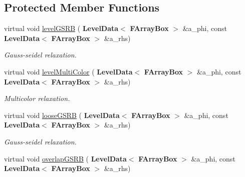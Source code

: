 \subsection*{Protected Member Functions}
\begin{DoxyCompactItemize}
\item 
\mbox{\label{class_a_m_r_non_linear_multi_comp_op_a8ec4d6960ca7282d700aa370b3ce875e}} 
virtual void \hyperlink{class_a_m_r_non_linear_multi_comp_op_a8ec4d6960ca7282d700aa370b3ce875e}{level\+G\+S\+RB} (\textbf{ Level\+Data}$<$ \textbf{ F\+Array\+Box} $>$ \&a\+\_\+phi, const \textbf{ Level\+Data}$<$ \textbf{ F\+Array\+Box} $>$ \&a\+\_\+rhs)
\begin{DoxyCompactList}\small\item\em Gauss-\/seidel relaxation. \end{DoxyCompactList}\item 
\mbox{\label{class_a_m_r_non_linear_multi_comp_op_a68cf60aeb967af9a3c7e1c628d7969f2}} 
virtual void \hyperlink{class_a_m_r_non_linear_multi_comp_op_a68cf60aeb967af9a3c7e1c628d7969f2}{level\+Multi\+Color} (\textbf{ Level\+Data}$<$ \textbf{ F\+Array\+Box} $>$ \&a\+\_\+phi, const \textbf{ Level\+Data}$<$ \textbf{ F\+Array\+Box} $>$ \&a\+\_\+rhs)
\begin{DoxyCompactList}\small\item\em Multicolor relaxation. \end{DoxyCompactList}\item 
\mbox{\label{class_a_m_r_non_linear_multi_comp_op_a2bb1423e981bdf7357bc3faab3385908}} 
virtual void \hyperlink{class_a_m_r_non_linear_multi_comp_op_a2bb1423e981bdf7357bc3faab3385908}{loose\+G\+S\+RB} (\textbf{ Level\+Data}$<$ \textbf{ F\+Array\+Box} $>$ \&a\+\_\+phi, const \textbf{ Level\+Data}$<$ \textbf{ F\+Array\+Box} $>$ \&a\+\_\+rhs)
\begin{DoxyCompactList}\small\item\em Gauss-\/seidel relaxation. \end{DoxyCompactList}\item 
\mbox{\label{class_a_m_r_non_linear_multi_comp_op_a123577c271aa45f550fbc159b03a144c}} 
virtual void \hyperlink{class_a_m_r_non_linear_multi_comp_op_a123577c271aa45f550fbc159b03a144c}{overlap\+G\+S\+RB} (\textbf{ Level\+Data}$<$ \textbf{ F\+Array\+Box} $>$ \&a\+\_\+phi, const \textbf{ Level\+Data}$<$ \textbf{ F\+Array\+Box} $>$ \&a\+\_\+rhs)

\end{DoxyCompactItemize}
